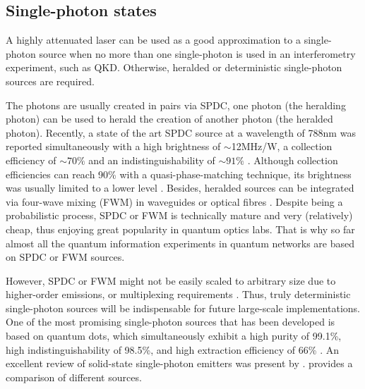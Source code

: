 %
%

\subsection{Single-photon states} 


A highly attenuated laser can be used as a good approximation to a single-photon source when no more than one single-photon is used in an interferometry experiment, such as QKD. Otherwise, heralded or deterministic single-photon sources are required.

The photons are usually created in pairs via SPDC, one photon (the heralding photon) can be used to herald the creation of another photon (the heralded photon). Recently, a state of the art SPDC source at a wavelength of 788nm was reported simultaneously with a high brightness of $\sim$12MHz/W, a collection efficiency of $\sim 70\%$ and an indistinguishability of $\sim 91\%$ \cite{bib:tenPhotEnt}. Although collection efficiencies can reach 90\% with a quasi-phase-matching technique, its brightness was usually limited to a lower level \cite{bib:giustina2013, bib:christensen2013}. Besides, heralded sources can be integrated via four-wave mixing (FWM) in waveguides  \cite{bib:silverstone2014, bib:spring2016} or optical fibres \cite{bib:goldschmidt2008, smith2009}. Despite being a probabilistic process, SPDC or FWM is technically mature and very (relatively) cheap, thus enjoying great popularity in quantum optics labs. That is why so far almost all the quantum information experiments in quantum networks are based on SPDC or FWM sources.

However, SPDC or FWM might not be easily scaled to arbitrary size due to higher-order emissions, or multiplexing requirements \cite{bib:RohdeLoopMulti15}. Thus, truly deterministic single-photon sources will be indispensable for future large-scale implementations. One of the most promising single-photon sources that has been developed is based on quantum dots, which simultaneously exhibit a high purity of 99.1\%, high indistinguishability of 98.5\%, and high extraction efficiency of 66\% \cite{bib:he2013on, bib:wei2014de, bib:ding2016on, bib:somaschi2016, bib:wang2016near, bib:loredo2016}. An excellent review of solid-state single-photon emitters was present by \cite{bib:aharonovich2016solid}. \cite{bib:eisaman2011} provides a comparison of different sources.

